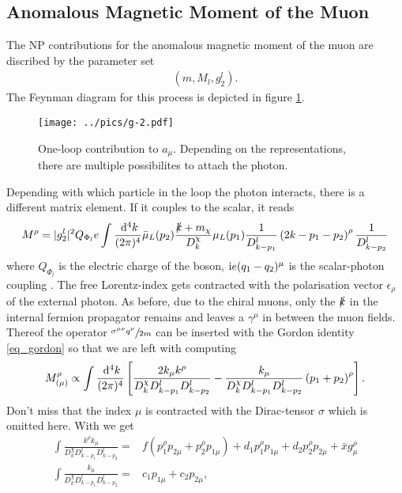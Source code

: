\subsection{Anomalous Magnetic Moment of the Muon}
The NP contributions for the anomalous magnetic moment of the muon are discribed by the parameter set 
\begin{align}
 \left(m, M_l, g_2^l\right).
\end{align}
The Feynman diagram for this process is depicted in figure \ref{pic_g-2}. 
\begin{figure}[t]
 \texttt{[image: ../pics/g-2.pdf]}
 \caption{One-loop contribution to $a_\mu$. Depending on the representations, there are multiple possibilites to attach the photon.}
 \label{pic_g-2}
\end{figure}
Depending with which particle in the loop the photon interacts, there is a different matrix element. If it couples to the scalar, it reads
\begin{align}
 M^\rho = |g_2^l|^2 Q_{\Phi_l} e \int \frac{\; \mathrm{d}^4 k}{(2\pi)^4} \bar\mu_L(p_2) \frac{\slashed{k}+m_\chi}{D^\chi_k}\mu_L(p_1) \frac{1}{D^l_{k-p_1}}\left(2k-p_1-p_2\right)^\rho\frac{1}{D^l_{k-p_2}}
\end{align}
where $Q_{\Phi_l}$ is the electric charge of the boson, $\text{i} e(q_1-q_2)^\mu$ is the scalar-photon coupling \cite{MDSchwartz}. 
The free Lorentz-index gets contracted with
the polarisation vector $\epsilon_\rho$ of the external photon. As before, due to the chiral muons, only the $\slashed{k}$ in the internal fermion
propagator remains and leaves a $\gamma^\mu$ in between the muon fields. Thereof the operator $\sfrac{\sigma^{\mu\nu}q^\nu}{2m}$ can be inserted with the Gordon 
identity \eqref{eq_gordon} so that we are left with computing 
\begin{align}
 M^\rho_{(\mu)} \propto \int\frac{\; \mathrm{d}^4 k}{(2\pi)^4} \left[ \frac{2k_\mu k^\rho}{D^\chi_kD^l_{k-p_1}D^l_{k-p_2}} - \frac{k_\mu}{D^\chi_kD^l_{k-p_1}D^l_{k-p_2}}\left(p_1 +p_2\right)^\rho \right].
\end{align}
Don't miss that the index $\mu$ is contracted with the Dirac-tensor $\sigma$ which is omitted here. With \cite{Lavoura} we get
\begin{align}
 \int\frac{ k^\rho k_\mu}{D^\chi_kD^l_{k-p_1}D^l_{k-p_2}} =&  f (p_1^\rho p_{2\mu} + p_2^\rho p_{1\mu}) +  d_1p_1^\rho p_{1\mu} +  d_2p_2^\rho p_{2\mu} + \bar x g^\rho_\mu\\
 \int\frac{k_\mu}{D^\chi_kD^l_{k-p_1}D^l_{k-p_2}} =&  c_1 p_{1\mu} +  c_2 p_{2\mu},
\end{align}
